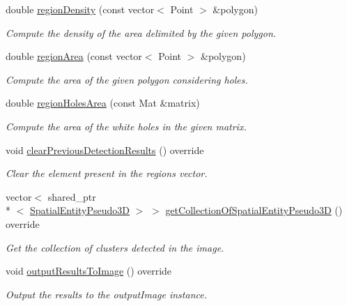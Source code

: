 \begin{DoxyCompactItemize}
double \hyperlink{classmultiscale_1_1analysis_1_1RegionDetector_a6beb6b2ecaccd60130bcf8dd808750b8}{region\-Density} (const vector$<$ Point $>$ \&polygon)
\begin{DoxyCompactList}\small\item\em Compute the density of the area delimited by the given polygon. \end{DoxyCompactList}\item 
double \hyperlink{classmultiscale_1_1analysis_1_1RegionDetector_a938fa8d165c87dc69e962883942072d2}{region\-Area} (const vector$<$ Point $>$ \&polygon)
\begin{DoxyCompactList}\small\item\em Compute the area of the given polygon considering holes. \end{DoxyCompactList}\item 
double \hyperlink{classmultiscale_1_1analysis_1_1RegionDetector_ab110a0a67852484c700ff035089fce18}{region\-Holes\-Area} (const Mat \&matrix)
\begin{DoxyCompactList}\small\item\em Compute the area of the white holes in the given matrix. \end{DoxyCompactList}\item 
void \hyperlink{classmultiscale_1_1analysis_1_1RegionDetector_a4a89f3a28cbb473acc32f22b49d09389}{clear\-Previous\-Detection\-Results} () override
\begin{DoxyCompactList}\small\item\em Clear the element present in the regions vector. \end{DoxyCompactList}\item 
vector$<$ shared\-\_\-ptr\\*
$<$ \hyperlink{classmultiscale_1_1analysis_1_1SpatialEntityPseudo3D}{Spatial\-Entity\-Pseudo3\-D} $>$ $>$ \hyperlink{classmultiscale_1_1analysis_1_1RegionDetector_a729a0433d9b929624960ae86e7cc1f23}{get\-Collection\-Of\-Spatial\-Entity\-Pseudo3\-D} () override
\begin{DoxyCompactList}\small\item\em Get the collection of clusters detected in the image. \end{DoxyCompactList}\item 
void \hyperlink{classmultiscale_1_1analysis_1_1RegionDetector_a23a3ada51983d2a3041f403323e27d06}{output\-Results\-To\-Image} () override
\begin{DoxyCompactList}\small\item\em Output the results to the output\-Image instance. \end{DoxyCompactList}\item 

\end{DoxyCompactItemize}
